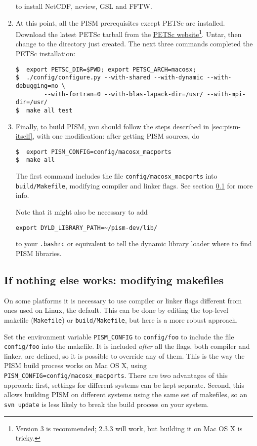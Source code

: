 \documentclass[11pt,final]{amsart}
\begin{document}
\begin{enumerate}
to install NetCDF, ncview, GSL and FFTW.
\item At this point, all the PISM prerequisites except PETSc are installed. Download the latest PETSc tarball from the
  \href{http://www.mcs.anl.gov/petsc/petsc-as/}{PETSc website}\footnote{Version 3 is recommended; 2.3.3 will work, but building it on Mac OS X is tricky.}. Untar, then change to the directory just created.
The next three commands completed the PETSc installation:
\begin{verbatim}
$  export PETSC_DIR=$PWD; export PETSC_ARCH=macosx;
$  ./config/configure.py --with-shared --with-dynamic --with-debugging=no \
        --with-fortran=0 --with-blas-lapack-dir=/usr/ --with-mpi-dir=/usr/
$  make all test
\end{verbatim}
\item Finally, to build PISM, you should follow the steps described in \ref{sec:pism-itself}, with one modification: after getting
  PISM sources, do
\begin{verbatim}
$  export PISM_CONFIG=config/macosx_macports
$  make all
\end{verbatim}
  The first command includes the file \texttt{config/macosx_macports} into \texttt{build/Makefile}, modifying compiler and linker flags. See
  section \ref{subsec:config} for more info.

  Note that it might also be necessary to add
\begin{verbatim}
export DYLD_LIBRARY_PATH=~/pism-dev/lib/
\end{verbatim}
  to your \texttt{.bashrc} or equivalent to tell the dynamic library loader where to find PISM libraries.
\end{enumerate}


\clearpage
\subsection{If nothing else works: modifying makefiles}
\label{subsec:config}

On some platforms it is necessary to use compiler or linker flags different from ones used on
Linux, the default.  This can be done by editing the top-level makefile (\texttt{Makefile}) or \texttt{build/Makefile}, but here is a more robust approach.

Set the environment variable \texttt{PISM_CONFIG} to \texttt{config/foo} to include the file \texttt{config/foo} into the makefile.  It is included \emph{after} all the flags, both compiler and linker, are defined, so it is possible to override any of them.   This is the way the PISM build process works on Mac OS X, using \texttt{PISM_CONFIG=config/macosx_macports}.  There are two advantages of this approach: first, settings for different systems can be kept separate.  Second, this allows building PISM on different systems using the same set of makefiles, so an \texttt{svn update} is less likely to break the build process on your system.
\end{document}
